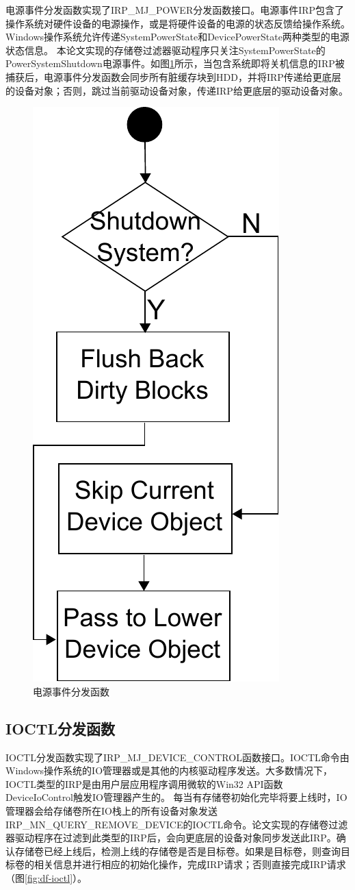 电源事件分发函数实现了IRP\_MJ\_POWER分发函数接口。电源事件IRP包含了操作系统对硬件设备的电源操作，或是将硬件设备的电源的状态反馈给操作系统。
Windows操作系统允许传递SystemPowerState和DevicePowerState两种类型的电源状态信息。
本论文实现的存储卷过滤器驱动程序只关注SystemPowerState的PowerSystemShutdown电源事件。如图\ref{fig:df-power}所示，当包含系统即将关机信息的IRP被捕获后，电源事件分发函数会同步所有脏缓存块到HDD，并将IRP传递给更底层的设备对象；否则，跳过当前驱动设备对象，传递IRP给更底层的驱动设备对象。

\begin{figure}[!ht]
\centering
\includegraphics[width=0.25\linewidth]{./graph/df-power}
\caption{电源事件分发函数}
\label{fig:df-power}
\end{figure}

\subsection{IOCTL分发函数}

IOCTL分发函数实现了IRP\_MJ\_DEVICE\_CONTROL函数接口。IOCTL命令由Windows操作系统的IO管理器或是其他的内核驱动程序发送。大多数情况下，IOCTL类型的IRP是由用户层应用程序调用微软的Win32 API函数DeviceIoControl触发IO管理器产生的。
每当有存储卷初始化完毕将要上线时，IO管理器会给存储卷所在IO栈上的所有设备对象发送IRP\_MN\_QUERY\_REMOVE\_DEVICE的IOCTL命令。论文实现的存储卷过滤器驱动程序在过滤到此类型的IRP后，会向更底层的设备对象同步发送此IRP。确认存储卷已经上线后，检测上线的存储卷是否是目标卷。如果是目标卷，则查询目标卷的相关信息并进行相应的初始化操作，完成IRP请求；否则直接完成IRP请求（图\ref{fig:df-ioctl}）。

